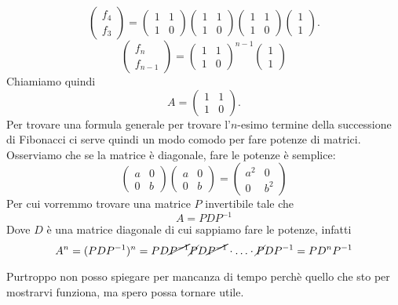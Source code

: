 \documentclass{article}     %
\begin{document}
\[\begin{pmatrix} f_4\\f_3 \end{pmatrix} = \begin{pmatrix} 1&1\\1&0 \end{pmatrix}\begin{pmatrix} 1&1\\1&0 \end{pmatrix}\begin{pmatrix} 1&1\\1&0 \end{pmatrix} \begin{pmatrix} 1\\1 \end{pmatrix}.\]
\[\begin{pmatrix} f_n\\f_{n -1} \end{pmatrix} = \begin{pmatrix} 1&1\\1&0 \end{pmatrix}^{n - 1} \begin{pmatrix} 1\\1 \end{pmatrix}\]
Chiamiamo quindi 
\[A =\begin{pmatrix} 1&1\\1&0 \end{pmatrix}.\]
Per trovare una formula generale per trovare l'$n$-esimo termine della successione di Fibonacci ci serve quindi un modo comodo per fare potenze di matrici. Osserviamo che se la matrice è diagonale, fare le potenze è semplice:
\[\begin{pmatrix} a&0\\0&b \end{pmatrix}\begin{pmatrix} a&0\\0&b \end{pmatrix} = \begin{pmatrix} a^2&0\\0&b^2 \end{pmatrix} \]
Per cui vorremmo trovare una matrice $P$ invertibile tale che 
\[A = PDP^{ - 1}\]
Dove $D$ è una matrice diagonale di cui sappiamo fare le potenze, infatti
\[A^{n} =(PDP^{ - 1})^n = PD\cancel{P^{ - 1}}\cancel{P}D\cancel{P^{ - 1}}\cdot \ldots \cdot \cancel{P}DP^{ - 1} = PD^nP^{ - 1}\]

Purtroppo non posso spiegare per mancanza di tempo perchè quello che sto per mostrarvi funziona, ma spero possa tornare utile.
\end{document}

